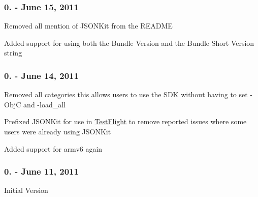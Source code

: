 \subsubsection*{0. -\/ June 15, 2011}


\begin{DoxyItemize}
\item Removed all mention of J\-S\-O\-N\-Kit from the R\-E\-A\-D\-M\-E
\item Added support for using both the Bundle Version and the Bundle Short Version string
\end{DoxyItemize}

\subsubsection*{0. -\/ June 14, 2011}


\begin{DoxyItemize}
\item Removed all categories this allows users to use the S\-D\-K without having to set -\/\-Obj\-C and -\/load\-\_\-all
\item Prefixed J\-S\-O\-N\-Kit for use in \hyperlink{interface_test_flight}{Test\-Flight} to remove reported issues where some users were already using J\-S\-O\-N\-Kit
\item Added support for armv6 again
\end{DoxyItemize}

\subsubsection*{0. -\/ June 11, 2011}


\begin{DoxyItemize}
\item Initial Version 
\end{DoxyItemize}
